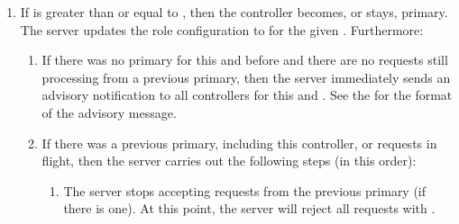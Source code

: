 \documentclass[11pt]{article}
\begin{document}
{%
\begin{enumerate}%

\item{}
If  is greater than or equal to , then the
controller becomes, or stays, primary. The server updates the role
configuration to  for the given . Furthermore:%

\begin{enumerate}%

\item{}
If there was no primary for this  and  before and
there are no  requests still processing from a previous primary,
then the server immediately sends an advisory notification to all
controllers for this  and . See the
 for the format of the
advisory message.%

\item{}
If there was a previous primary, including this controller, or 
requests in flight, then the server carries out the following steps
(in this order):%

\begin{enumerate}%

\item{}
The server stops accepting  requests from the previous primary
(if there is one). At this point, the server will reject all 
requests with .%


\end{enumerate}
\end{enumerate}
\end{enumerate}}
\end{document}
